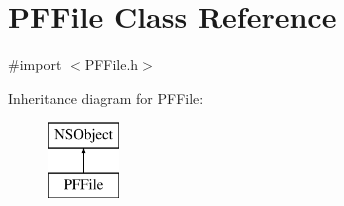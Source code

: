 \hypertarget{interface_p_f_file}{}\section{P\+F\+File Class Reference}
\label{interface_p_f_file}


{\ttfamily \#import $<$P\+F\+File.\+h$>$}

Inheritance diagram for P\+F\+File\+:\begin{figure}[H]
\begin{center}
\leavevmode
\includegraphics[height=2.000000cm]{interface_p_f_file}
\end{center}
\end{figure}
